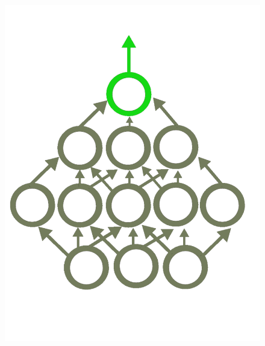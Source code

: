 \begin{figure}[!htb]
  \includegraphics[width=\linewidth]{./Images/Chapter04/frozen_net.pdf}
\endminipage\hfill
{}

\end{figure}
